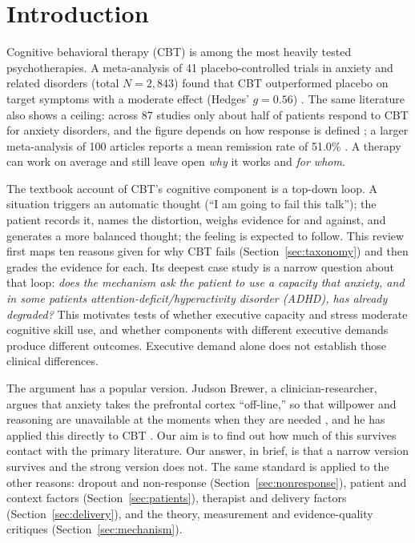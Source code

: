 \section{Introduction}
Cognitive behavioral therapy (CBT) is among the most heavily tested psychotherapies.
A meta-analysis of 41 placebo-controlled trials in anxiety and related disorders (total $N=2{,}843$) found that CBT outperformed placebo on target symptoms with a moderate effect (Hedges' $g=0.56$) \citep{carpenter2018cbt}.
The same literature also shows a ceiling: across 87 studies only about half of patients respond to CBT for anxiety disorders, and the figure depends on how response is defined \citep{loerinc2015response}; a larger meta-analysis of 100 articles reports a mean remission rate of 51.0\% \citep{springer2018remission}.
A therapy can work on average and still leave open \emph{why} it works and \emph{for whom}.

The textbook account of CBT's cognitive component is a top-down loop.
A situation triggers an automatic thought (``I am going to fail this talk''); the patient records it, names the distortion, weighs evidence for and against, and generates a more balanced thought; the feeling is expected to follow.
This review first maps ten reasons given for why CBT fails (Section~\ref{sec:taxonomy}) and then grades the evidence for each.
Its deepest case study is a narrow question about that loop: \emph{does the mechanism ask the patient to use a capacity that anxiety, and in some patients attention-deficit/hyperactivity disorder (ADHD), has already degraded?} This motivates tests of whether executive capacity and stress moderate cognitive skill use, and whether components with different executive demands produce different outcomes.
Executive demand alone does not establish those clinical differences.

The argument has a popular version.
Judson Brewer, a clinician-researcher, argues that anxiety takes the prefrontal cortex ``off-line,'' so that willpower and reasoning are unavailable at the moments when they are needed \citep{brewer2016habit,brewer2021unwinding}, and he has applied this directly to CBT \citep{brewer2026cbt}.
Our aim is to find out how much of this survives contact with the primary literature.
Our answer, in brief, is that a narrow version survives and the strong version does not.
The same standard is applied to the other reasons: dropout and non-response (Section~\ref{sec:nonresponse}), patient and context factors (Section~\ref{sec:patients}), therapist and delivery factors (Section~\ref{sec:delivery}), and the theory, measurement and evidence-quality critiques (Section~\ref{sec:mechanism}).


